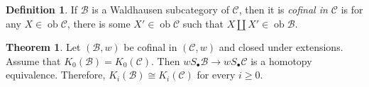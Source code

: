 \documentclass[10pt,letterpaper,cm]{nupset}
\theoremstyle{definition}
\newtheorem{definition}{Definition}
\theoremstyle{theorem}
\newtheorem{theorem}{Theorem}
\theoremstyle{remark}
\newcommand{\1}{\mathbf{1}}
\renewcommand{\b}{\mathscr{B}}
\renewcommand{\c}{\mathscr{C}}
\newcommand{\0}{\vec 0}
\DeclareMathOperator{\ob}{ob}
\begin{document}
\begin{definition}
If $\b$ is a Waldhausen subcategory of $\c$, then it is \textit{cofinal in $\c$} is for any $X \in \ob \c$, there is some $X' \in \ob \c$ such that $X \coprod X' \in \ob \b$.
\end{definition}

\begin{theorem}
Let $(\b, w)$ be cofinal in $(\c, w)$ and closed under extensions. Assume that $K_0(\b) = K_0(\c)$. Then $wS_{\bullet}\b \to wS_{\bullet}\c$ is a homotopy equivalence. Therefore, $K_i(\b) \cong K_i(\c)$ for every $i\geq 0$.
\end{theorem}
\end{document}
